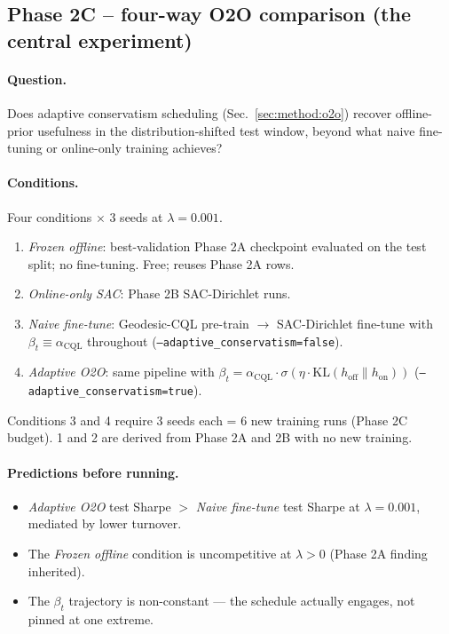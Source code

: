 \subsection{Phase 2C -- four-way O2O comparison (the central experiment)}
\label{sec:experiments:phase2c}

\paragraph{Question.} Does adaptive conservatism scheduling
(Sec.~\ref{sec:method:o2o}) recover offline-prior usefulness in the
distribution-shifted test window, beyond what naive fine-tuning or
online-only training achieves?

\paragraph{Conditions.} Four conditions $\times$ 3 seeds at
$\lambda{=}0.001$.
\begin{enumerate}\setlength\itemsep{0pt}
  \item \emph{Frozen offline}: best-validation Phase 2A checkpoint
    evaluated on the test split; no fine-tuning. Free; reuses Phase 2A
    rows.
  \item \emph{Online-only SAC}: Phase 2B SAC-Dirichlet runs.
  \item \emph{Naive fine-tune}: Geodesic-CQL pre-train $\rightarrow$
    SAC-Dirichlet fine-tune with $\beta_t \equiv \alpha_{\mathrm{CQL}}$
    throughout (\texttt{--adaptive\_conservatism=false}).
  \item \emph{Adaptive O2O}: same pipeline with $\beta_t = \alpha_{\mathrm{CQL}}
    \cdot \sigma(\eta \cdot \mathrm{KL}(h_{\mathrm{off}} \| h_{\mathrm{on}}))$
    (\texttt{--adaptive\_conservatism=true}).
\end{enumerate}

Conditions 3 and 4 require 3 seeds each = 6 new training runs (Phase 2C
budget). 1 and 2 are derived from Phase 2A and 2B with no new training.

\paragraph{Predictions before running.}
\begin{itemize}\setlength\itemsep{0pt}
  \item \emph{Adaptive O2O} test Sharpe $>$ \emph{Naive fine-tune}
    test Sharpe at $\lambda{=}0.001$, mediated by lower turnover.
  \item The \emph{Frozen offline} condition is uncompetitive at $\lambda
    > 0$ (Phase 2A finding inherited).
  \item The $\beta_t$ trajectory is non-constant --- the schedule
    actually engages, not pinned at one extreme.
\end{itemize}

